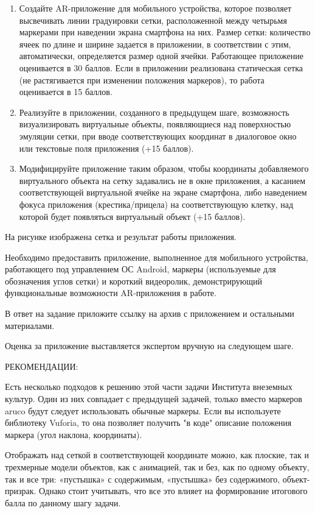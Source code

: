 
\begin{enumerate}
    \item Создайте AR-приложение для мобильного устройства, которое позволяет высвечивать линии градуировки сетки, расположенной между четырьмя маркерами при наведении экрана смартфона на них. Размер сетки: количество ячеек по длине и ширине задается в приложении, в соответствии с этим, автоматически, определяется размер одной ячейки. Работающее приложение оценивается в 30 баллов. Если в приложении реализована статическая сетка (не растягивается при изменении положения маркеров), то работа оценивается в 15 баллов.
    \item Реализуйте в приложении, созданного в предыдущем шаге, возможность визуализировать виртуальные объекты, появляющиеся над поверхностью эмуляции сетки, при вводе соответствующих координат в диалоговое окно или текстовые поля приложения (+15 баллов).
    \item Модифицируйте приложение таким образом, чтобы координаты добавляемого виртуального объекта на сетку задавались не в окне приложения, а касанием соответствующей виртуальной ячейке на экране смартфона, либо наведением фокуса приложения (крестика/прицела) на соответствующую клетку, над которой будет появляться виртуальный объект (+15 баллов).
\end{enumerate}

На рисунке изображена сетка и результат работы приложения.


Необходимо предоставить приложение, выполненное для мобильного устройства, работающего под управлением ОС Android, маркеры (используемые для обозначения углов сетки) и короткий видеоролик, демонстрирующий функциональные возможности AR-приложения в работе. 

В ответ на задание приложите ссылку на архив с приложением и остальными материалами. 

Оценка за приложение выставляется экспертом вручную на следующем шаге.

РЕКОМЕНДАЦИИ:

Есть несколько подходов к решению этой части задачи Института внеземных культур. Один из них совпадает с предыдущей задачей, только вместо маркеров aruco будут следует использовать обычные маркеры. Если вы используете библиотеку Vuforia, то она позволяет получить "в коде" описание положения маркера (угол наклона, координаты).

Отображать над сеткой в соответствующей координате можно, как плоские, так и трехмерные модели объектов, как с анимацией, так и без, как по одному объекту, так и все три: «пустышка» с содержимым, «пустышка» без содержимого, объект-призрак. Однако стоит учитывать, что все это влияет на формирование итогового балла по данному шагу задачи.